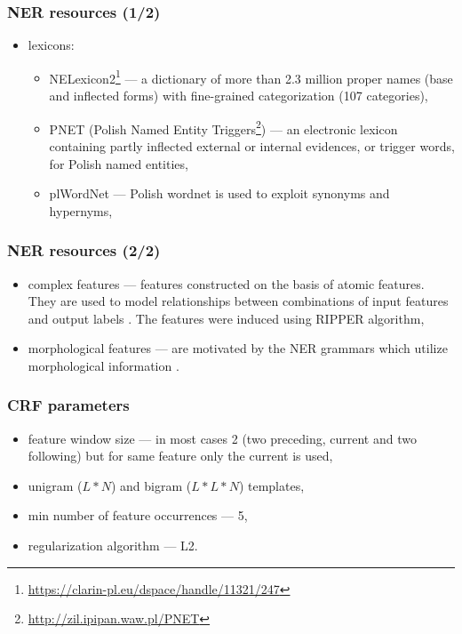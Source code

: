 \documentclass[Warsaw]{beamer}
\begin{document}
\begin{frame}
    \frametitle{NER resources (1/2)}
    \begin{itemize}
        \item lexicons:
        \begin{itemize}
            \item NELexicon2\footnote{\url{https://clarin-pl.eu/dspace/handle/11321/247}} --- a dictionary of more than 2.3 million proper names (base and inflected forms) with fine-grained categorization (107 categories),
            \item PNET (Polish Named Entity Triggers\footnote{\url{http://zil.ipipan.waw.pl/PNET}}) --- an electronic lexicon containing partly inflected external or internal evidences, or trigger words, for Polish named entities,
            \item plWordNet \cite{MazPiaRudSzpaKedz:16} --- Polish wordnet is used to exploit synonyms and hypernyms,
        \end{itemize}
    \end{itemize}
\end{frame}

\begin{frame}
    \frametitle{NER resources (2/2)}
    \begin{itemize}
        \item complex features --- features constructed on the basis of atomic features. They are used to model relationships between combinations of input features and output labels \cite{Marcinczuk2015}. The features were induced using RIPPER algorithm,
        \item morphological features --- are motivated by the NER grammars which utilize morphological information \cite{Piskorski2004a}.
    \end{itemize}
\end{frame}

\begin{frame}
    \frametitle{CRF parameters}
    \begin{itemize}
        \item feature window size --- in most cases 2 (two preceding, current and two following) but for same feature only the current is used,
        \item unigram ($L*N$) and bigram ($L*L*N$) templates,
        \item min number of feature occurrences --- 5,
        \item regularization algorithm --- L2.
    \end{itemize}
\end{frame}
    
\end{document}
